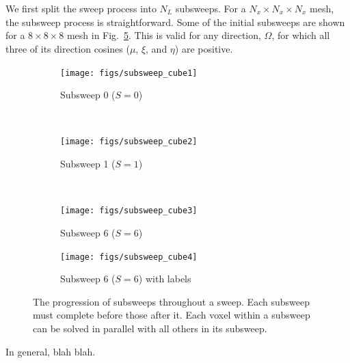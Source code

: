 We first split the sweep process into $N_L$ subsweeps. For a $N_x \times N_x \times N_x$ mesh, the subsweep process is straightforward. Some of the initial subsweeps are shown for a $8 \times 8 \times 8$ mesh in Fig.~\ref{fig:subsweep_cube}. This is valid for any direction, $\hat{\Omega}$, for which all three of its direction cosines ($\mu$, $\xi$, and $\eta$) are positive.

\begin{figure}
    \centering
    \begin{subfigure}[b]{0.45\textwidth}
        \texttt{[image: figs/subsweep\_cube1]}
        \caption{Subsweep 0 ($S=0$)}
        \label{fig:subsweep_cube1}
    \end{subfigure}
    ~ %
    \begin{subfigure}[b]{0.45\textwidth}
        \texttt{[image: figs/subsweep\_cube2]}
        \caption{Subsweep 1 ($S=1$)}
        \label{fig:subsweep_cube2}
    \end{subfigure}
    ~ %
    \begin{subfigure}[b]{0.45\textwidth}
        \texttt{[image: figs/subsweep\_cube3]}
        \caption{Subsweep 6 ($S=6$)}
        \label{fig:subsweep_cube3}
    \end{subfigure}
    \begin{subfigure}[b]{0.45\textwidth}
        \texttt{[image: figs/subsweep\_cube4]}
        \caption{Subsweep 6 ($S=6$) with labels}
        \label{fig:subsweep_cube4}
    \end{subfigure}
    \caption{The progression of subsweeps throughout a sweep. Each subsweep must complete before those after it. Each voxel within a subsweep can be solved in parallel with all others in its subsweep.}\label{fig:subsweep_cube}
\end{figure}

In general, blah blah.

